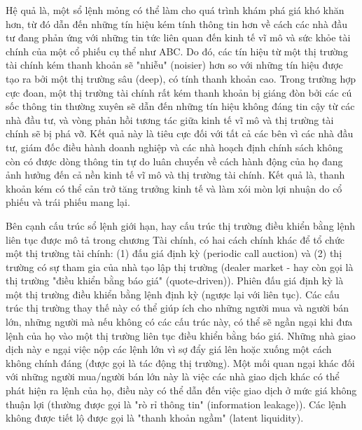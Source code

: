 Hệ quả là, một sổ lệnh mỏng có thể làm cho quá trình khám phá giá khó khăn hơn, từ đó dẫn đến những tín hiệu kém tính thông tin hơn về cách các nhà đầu tư đang phản ứng với những tin tức liên quan đến kinh tế vĩ mô và sức khỏe tài chính của một cổ phiếu cụ thể như ABC. Do đó, các tín hiệu từ một thị trường tài chính kém thanh khoản sẽ "nhiễu" (noisier) hơn so với những tín hiệu được tạo ra bởi một thị trường sâu (deep), có tính thanh khoản cao. Trong trường hợp cực đoan, một thị trường tài chính rất kém thanh khoản bị giáng đòn bởi các cú sốc thông tin thường xuyên sẽ dẫn đến những tín hiệu không đáng tin cậy từ các nhà đầu tư, và vòng phản hồi tương tác giữa kinh tế vĩ mô và thị trường tài chính sẽ bị phá vỡ. Kết quả này là tiêu cực đối với tất cả các bên vì các nhà đầu tư, giám đốc điều hành doanh nghiệp và các nhà hoạch định chính sách không còn có được dòng thông tin tự do luân chuyển về cách hành động của họ đang ảnh hưởng đến cả nền kinh tế vĩ mô và thị trường tài chính. Kết quả là, thanh khoản kém có thể cản trở tăng trưởng kinh tế và làm xói mòn lợi nhuận do cổ phiếu và trái phiếu mang lại.

Bên cạnh cấu trúc sổ lệnh giới hạn, hay cấu trúc thị trường điều khiển bằng lệnh liên tục được mô tả trong chương Tài chính, có hai cách chính khác để tổ chức một thị trường tài chính: (1) đấu giá định kỳ (periodic call auction) và (2) thị trường có sự tham gia của nhà tạo lập thị trường (dealer market - hay còn gọi là thị trường "điều khiển bằng báo giá" (quote-driven)). Phiên đấu giá định kỳ là một thị trường điều khiển bằng lệnh định kỳ (ngược lại với liên tục). Các cấu trúc thị trường thay thế này có thể giúp ích cho những người mua và người bán lớn, những người mà nếu không có các cấu trúc này, có thể sẽ ngần ngại khi đưa lệnh của họ vào một thị trường liên tục điều khiển bằng báo giá. Những nhà giao dịch này e ngại việc nộp các lệnh lớn vì sợ đẩy giá lên hoặc xuống một cách không chính đáng (được gọi là tác động thị trường). Một mối quan ngại khác đối với những người mua/người bán lớn này là việc các nhà giao dịch khác có thể phát hiện ra lệnh của họ, điều này có thể dẫn đến việc giao dịch ở mức giá không thuận lợi (thường được gọi là "rò rỉ thông tin" (information leakage)). Các lệnh không được tiết lộ được gọi là "thanh khoản ngầm" (latent liquidity).

